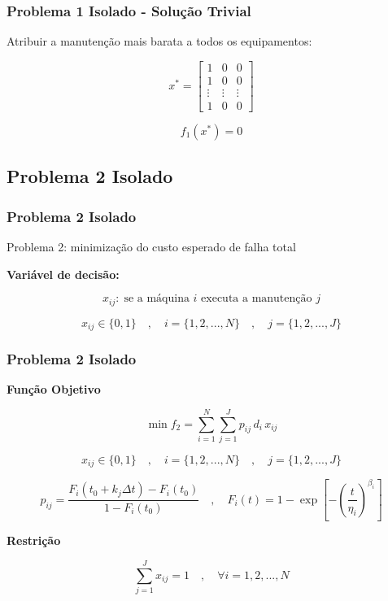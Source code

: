 \documentclass{beamer}
\newcommand{\un}[1]{\;\text{#1}}
\begin{document}
    \begin{frame}
        \frametitle{Problema 1 Isolado - Solução Trivial}

        \begin{center}
            Atribuir a manutenção mais barata a todos os equipamentos:
        \end{center}


        \[ x^{*} = \begin{bmatrix} 
            1 & 0 & 0 \\
            1 & 0 & 0 \\
            \vdots & \vdots & \vdots \\
            1 &  0      & 0 
            \end{bmatrix} \]

        \vspace{1cm}

       \[ f_1\left(x^{*}\right) =  0 \]
    \end{frame}

    \subsection{Problema 2 Isolado}
    \begin{frame}
        \frametitle{Problema 2 Isolado}

        \begin{center}
            Problema 2: minimização do custo esperado de falha total
        \end{center}

        \vspace{0.5cm}

        \textbf{Variável de decisão:}

        \[  x_{ij}: \un{se a máquina $i$ executa a manutenção $j$}  \]
        
        \[ x_{ij} \in \{0,1\} \quad , \quad i = \{1, 2, ..., N\}  \quad , \quad j = \{1, 2, ..., J\} \]

    \end{frame}

    \begin{frame}
        \frametitle{Problema 2 Isolado}

        \textbf{Função Objetivo}

        \[  \min f_2 = \sum_{i=1}^{N} \sum_{j=1}^{J} p_{ij} \, d_i \, x_{ij} \]

        \[ x_{ij} \in \{0,1\} \quad , \quad i = \{1, 2, ..., N\}  \quad , \quad j = \{1, 2, ..., J\} \]

        \[ 
        p_{ij} = \frac{F_i \left(t_0 + k_j \Delta t \right) - F_i\left(t_0\right) }{1 - F_i\left(t_0\right)}
        \quad , \quad 
        F_i(t) = 1 - \exp \left[ - \left( \frac{t}{\eta_i} \right)^{\beta_i} \right] 
        \]

        \vspace{0.5cm}
        
        \textbf{Restrição}

        \[ \sum_{j=1}^{J} x_{ij} = 1 \quad , \quad \forall i = {1, 2, ..., N} \]
    \end{frame}
\end{document}
